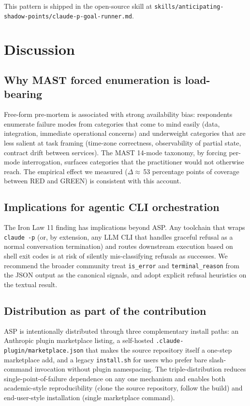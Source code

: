 \documentclass[11pt, a4paper]{article}
\begin{document}
This pattern is shipped in the open-source skill at \texttt{skills/anticipating-shadow-points/claude-p-goal-runner.md}.

\section{Discussion}
\label{sec:discussion}

\subsection{Why MAST forced enumeration is load-bearing}
Free-form pre-mortem is associated with strong availability bias: respondents enumerate failure modes from categories that come to mind easily (data, integration, immediate operational concerns) and underweight categories that are less salient at task framing (time-zone correctness, observability of partial state, contract drift between services). The MAST 14-mode taxonomy, by forcing per-mode interrogation, surfaces categories that the practitioner would not otherwise reach. The empirical effect we measured ($\Delta \approx$\,53 percentage points of coverage between RED and GREEN) is consistent with this account.

\subsection{Implications for agentic CLI orchestration}
The Iron Law 11 finding has implications beyond ASP. Any toolchain that wraps \texttt{claude -p} (or, by extension, any LLM CLI that handles graceful refusal as a normal conversation termination) and routes downstream execution based on shell exit codes is at risk of silently mis-classifying refusals as successes. We recommend the broader community treat \texttt{is\_error} and \texttt{terminal\_reason} from the JSON output as the canonical signals, and adopt explicit refusal heuristics on the textual result.

\subsection{Distribution as part of the contribution}
ASP is intentionally distributed through three complementary install paths: an Anthropic plugin marketplace listing, a self-hosted \texttt{.claude-plugin/marketplace.json} that makes the source repository itself a one-step marketplace add, and a legacy \texttt{install.sh} for users who prefer bare slash-command invocation without plugin namespacing. The triple-distribution reduces single-point-of-failure dependence on any one mechanism and enables both academic-style reproducibility (clone the source repository, follow the build) and end-user-style installation (single marketplace command).
\end{document}
